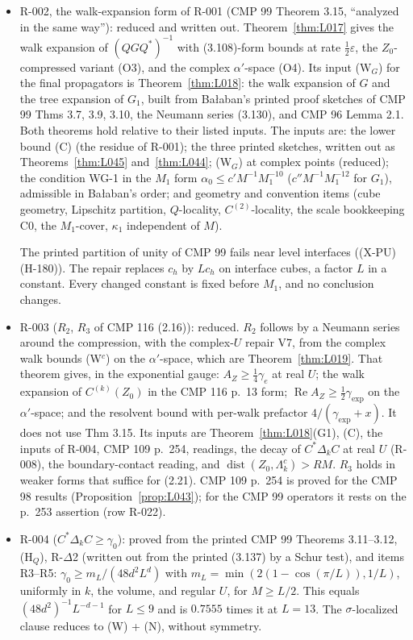 \begin{itemize}
\begin{itemize}
\item R-002, the walk-expansion form of R-001 (CMP 99 Theorem 3.15, ``analyzed in the same way''): reduced and written out. Theorem~\ref{thm:L017} gives the walk expansion of $(QGQ^*)^{-1}$ with (3.108)-form bounds at rate $\tfrac12\varepsilon$, the $Z_0$-compressed variant (O3), and the complex $\alpha'$-space (O4). Its input (W$_G$) for the final propagators is Theorem~\ref{thm:L018}: the walk expansion of $G$ and the tree expansion of $G_1$, built from Ba{\l}aban's printed proof sketches of CMP 99 Thms 3.7, 3.9, 3.10, the Neumann series (3.130), and CMP 96 Lemma 2.1. Both theorems hold relative to their listed inputs. The inputs are: the lower bound (C) (the residue of R-001); the three printed sketches, written out as Theorems~\ref{thm:L045} and~\ref{thm:L044}; (W$_G$) at complex points (reduced); the condition WG-1 in the $M_1$ form $\alpha_0\le c'M^{-1}M_1^{-10}$ ($c''M^{-1}M_1^{-12}$ for $G_1$), admissible in Ba{\l}aban's order; and geometry and convention items (cube geometry, Lipschitz partition, $Q$-locality, $C^{(2)}$-locality, the scale bookkeeping C0, the $M_1$-cover, $\kappa_1$ independent of $M$).
\begin{remark}
The printed partition of unity of CMP 99 fails near level interfaces ((X-PU) (H-180)). The repair replaces $c_h$ by $Lc_h$ on interface cubes, a factor $L$ in a constant. Every changed constant is fixed before $M_1$, and no conclusion changes.
\end{remark}
\item R-003 ($R_2$, $R_3$ of CMP 116 (2.16)): reduced. $R_2$ follows by a Neumann series around the compression, with the complex-$U$ repair V7, from the complex walk bounds (W$^c$) on the $\alpha'$-space, which are Theorem~\ref{thm:L019}. That theorem gives, in the exponential gauge: $A_Z\ge\tfrac14\gamma_e$ at real $U$; the walk expansion of $C^{(k)}(Z_0)$ in the CMP 116 p.~13 form; $\operatorname{Re}A_Z\ge\tfrac12\gamma_{\exp}$ on the $\alpha'$-space; and the resolvent bound with per-walk prefactor $4/(\gamma_{\exp}+x)$. It does not use Thm 3.15. Its inputs are Theorem~\ref{thm:L018}(G1), (C), the inputs of R-004, CMP 109 p.~254, readings, the decay of $C^*\Delta_kC$ at real $U$ (R-008), the boundary-contact reading, and $\operatorname{dist}(Z_0,\Lambda_k^c)>RM$. $R_3$ holds in weaker forms that suffice for (2.21). CMP 109 p.~254 is proved for the CMP 98 results (Proposition~\ref{prop:L043}); for the CMP 99 operators it rests on the p.~253 assertion (row R-022).
\item R-004 ($C^*\Delta_kC\ge\gamma_0$): proved from the printed CMP 99 Theorems 3.11--3.12, (H$_Q$), R-$\Delta$2 (written out from the printed (3.137) by a Schur test), and items R3--R5: $\gamma_0\ge m_L/(48d^2L^d)$ with $m_L=\min(2(1-\cos(\pi/L)),1/L)$, uniformly in $k$, the volume, and regular $U$, for $M\ge L/2$. This equals $(48d^2)^{-1}L^{-d-1}$ for $L\le9$ and is $0.7555$ times it at $L=13$. The $\sigma$-localized clause reduces to (W) + (N), without symmetry.

\end{itemize}
\end{itemize}
